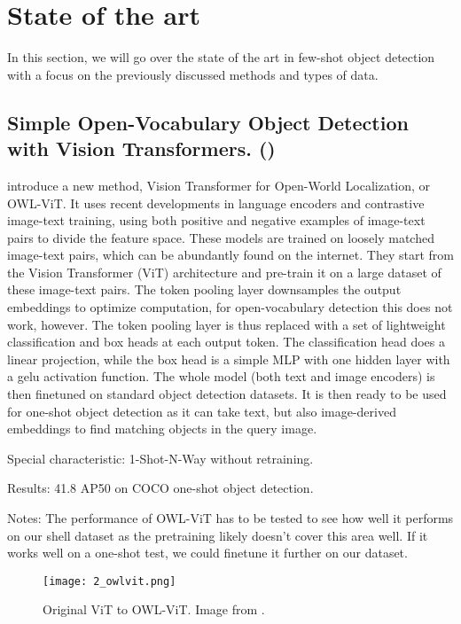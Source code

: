 \section{State of the art}
In this section, we will go over the state of the art in few-shot object detection with a focus on the previously discussed methods and types of data.

\subsection*{Simple Open-Vocabulary Object Detection
with Vision Transformers. (\citet{owlvit})}

\citet{owlvit} introduce a new method, Vision Transformer for Open-World Localization, or OWL-ViT. It uses recent developments in language encoders and contrastive image-text training, using both positive and negative examples of image-text pairs to divide the feature space. These models are trained on loosely matched image-text pairs, which can be abundantly found on the internet. They start from the Vision Transformer (ViT) architecture and pre-train it on a large dataset of these image-text pairs. The token pooling layer downsamples the output embeddings to optimize computation, for open-vocabulary detection this does not work, however. The token pooling layer is thus replaced with a set of lightweight classification and box heads at each output token. The classification head does a linear projection, while the box head is a simple MLP with one hidden layer with a gelu activation function. The whole model (both text and image encoders) is then finetuned on standard object detection datasets. It is then ready to be used for one-shot object detection as it can take text, but also image-derived embeddings to find matching objects in the query image.

Special characteristic: 1-Shot-N-Way without retraining.

Results: 41.8 AP50 on COCO one-shot object detection.

Notes: The performance of OWL-ViT has to be tested to see how well it performs on our shell dataset as the pretraining likely doesn't cover this area well. If it works well on a one-shot test, we could finetune it further on our dataset.

\begin{figure}[h]
	\centering
	\texttt{[image: 2\_owlvit.png]}
	\caption{\label{fig:2_owl-vitr} Original ViT to OWL-ViT. Image from \citet{owlvit}.}
\end{figure}

